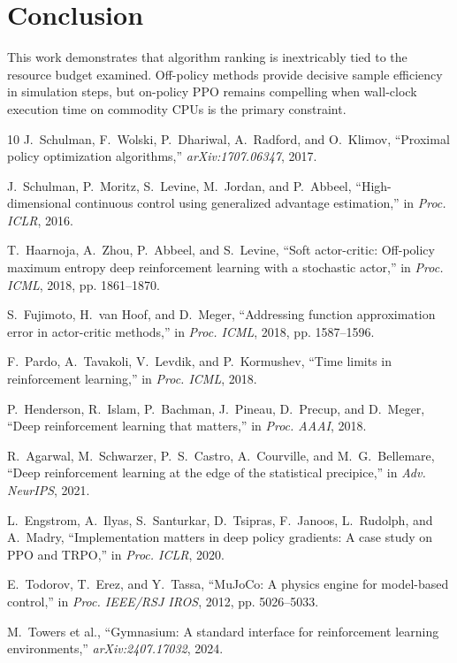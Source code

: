 \documentclass[10pt,journal,compsoc]{IEEEtran}
\begin{document}
\section{Conclusion}
This work demonstrates that algorithm ranking is inextricably tied to the resource budget examined. Off-policy methods provide decisive sample efficiency in simulation steps, but on-policy PPO remains compelling when wall-clock execution time on commodity CPUs is the primary constraint.

\begin{thebibliography}{10}
J.~Schulman, F.~Wolski, P.~Dhariwal, A.~Radford, and O.~Klimov, ``Proximal policy optimization algorithms,'' \textit{arXiv:1707.06347}, 2017.

J.~Schulman, P.~Moritz, S.~Levine, M.~Jordan, and P.~Abbeel, ``High-dimensional continuous control using generalized advantage estimation,'' in \textit{Proc. ICLR}, 2016.

T.~Haarnoja, A.~Zhou, P.~Abbeel, and S.~Levine, ``Soft actor-critic: Off-policy maximum entropy deep reinforcement learning with a stochastic actor,'' in \textit{Proc. ICML}, 2018, pp. 1861--1870.

S.~Fujimoto, H.~van Hoof, and D.~Meger, ``Addressing function approximation error in actor-critic methods,'' in \textit{Proc. ICML}, 2018, pp. 1587--1596.

F.~Pardo, A.~Tavakoli, V.~Levdik, and P.~Kormushev, ``Time limits in reinforcement learning,'' in \textit{Proc. ICML}, 2018.

P.~Henderson, R.~Islam, P.~Bachman, J.~Pineau, D.~Precup, and D.~Meger, ``Deep reinforcement learning that matters,'' in \textit{Proc. AAAI}, 2018.

R.~Agarwal, M.~Schwarzer, P.~S.~Castro, A.~Courville, and M.~G.~Bellemare, ``Deep reinforcement learning at the edge of the statistical precipice,'' in \textit{Adv. NeurIPS}, 2021.

L.~Engstrom, A.~Ilyas, S.~Santurkar, D.~Tsipras, F.~Janoos, L.~Rudolph, and A.~Madry, ``Implementation matters in deep policy gradients: A case study on PPO and TRPO,'' in \textit{Proc. ICLR}, 2020.

E.~Todorov, T.~Erez, and Y.~Tassa, ``MuJoCo: A physics engine for model-based control,'' in \textit{Proc. IEEE/RSJ IROS}, 2012, pp. 5026--5033.

M.~Towers et al., ``Gymnasium: A standard interface for reinforcement learning environments,'' \textit{arXiv:2407.17032}, 2024.
\end{thebibliography}
\end{document}
